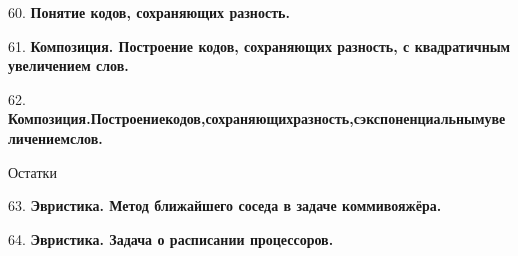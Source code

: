 \documentclass[12pt]{article}
\begin{document}
60. \textbf{Понятие кодов, сохраняющих разность.}

61. \textbf{Композиция. Построение кодов, сохраняющих разность, с квадратичным увеличением слов.}

62. \textbf{Композиция.Построениекодов,сохраняющихразность,сэкспоненциальнымувеличениемслов.}

\begin{center}
    Остатки
\end{center}

63. \textbf{Эвристика. Метод ближайшего соседа в задаче коммивояжёра.}

64. \textbf{Эвристика. Задача о расписании процессоров.}
\end{document}
